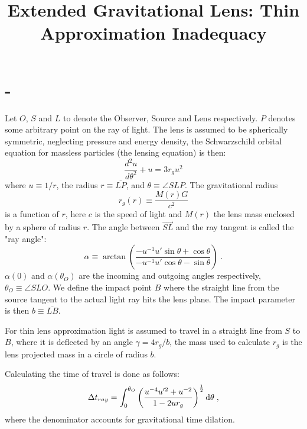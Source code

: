 \documentclass{article}
\begin{document}
\title{Extended Gravitational Lens: Thin Approximation Inadequacy}

\maketitle

\section{-}

Let $O$, $S$ and $L$ to denote the Observer, Source and Lens respectively. $P$ denotes some arbitrary point on the ray of light. The lens is assumed to be spherically symmetric, neglecting pressure and energy density, the Schwarzschild orbital equation for massless particles (the lensing equation) is then:
\begin{equation}
    \label{eq1}
    \frac{d^2u}{d\theta^2}+u=3r_gu^2
\end{equation}
where $u\equiv1/r$, the radius $r\equiv \overline{LP}$, and $\theta\equiv \angle SLP$.
The gravitational radius  
\begin{equation}
    \label{eq2}
    r_g(r) \equiv \frac{M(r)G}{c^2}
\end{equation}
is a function of $r$, here $c$ is the speed of light and $M(r)$ the lens mass enclosed by a sphere of radius $r$. The angle between $\vec{SL}$ and the ray tangent is called the "ray angle":
\begin{equation}
    \label{eq3}
    \alpha \equiv \arctan \left( \frac{-u^{-1}u'\sin \theta + \cos \theta}{-u^{-1}u'\cos \theta - \sin \theta} \right) \;.
\end{equation}
$\alpha(0)$ and $\alpha(\theta_O)$ are the incoming and outgoing angles respectively, $\theta_O\equiv \angle SLO$. We define the impact point $B$ where the straight line from the source tangent to the actual light ray hits the lens plane. The impact parameter is then $b \equiv \overline{LB}$. 

For thin lens approximation light is assumed to travel in a straight line from $S$ to $B$, where it is deflected by an angle $\gamma=4r_g/b$, the mass used to calculate $r_g$ is the lens projected mass in a circle of radius $b$.

Calculating the time of travel is done as follows:
\begin{equation}
    \label{eq4}
    \Delta t_{ray} = \int_{0}^{\theta_O} \left( \frac{u^{-4}u'^2+u^{-2}}{1-2ur_g} \right)^{\frac{1}{2}} {\rm d}  \theta \;,
\end{equation}
where the denominator accounts for gravitational time dilation.
\end{document}

